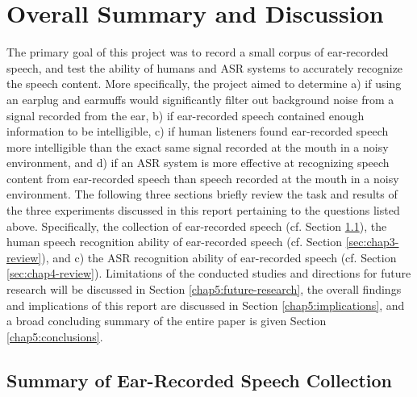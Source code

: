 % 
% 
% 

\chapter{Overall Summary and Discussion\label{chapter5}}


The primary goal of this project was to record a small corpus of ear-recorded speech, and test the ability of humans and ASR systems to accurately recognize the speech content.  More specifically, the project aimed to determine a) if using an earplug and earmuffs would significantly filter out background noise from a signal recorded from the ear, b) if ear-recorded speech contained enough information to be intelligible, c) if human listeners found ear-recorded speech more intelligible than the exact same signal recorded at the mouth in a noisy environment, and d) if an ASR system is more effective at recognizing speech content from ear-recorded speech than speech recorded at the mouth in a noisy environment. The following three sections briefly review the task and results of the three experiments discussed in this report pertaining to the questions listed above. Specifically, the collection of ear-recorded speech (cf. Section \ref{sec:chap2-review}), the human speech recognition ability of ear-recorded speech (cf. Section \ref{sec:chap3-review}), and c) the ASR recognition ability of ear-recorded speech (cf. Section \ref{sec:chap4-review}).  Limitations of the conducted studies and directions for future research will be discussed in Section \ref{chap5:future-research}, the overall findings and implications of this report are discussed in Section \ref{chap5:implications}, and a broad concluding summary of the entire paper is given Section \ref{chap5:conclusions}.


\section{Summary of Ear-Recorded Speech Collection}\label{sec:chap2-review}

